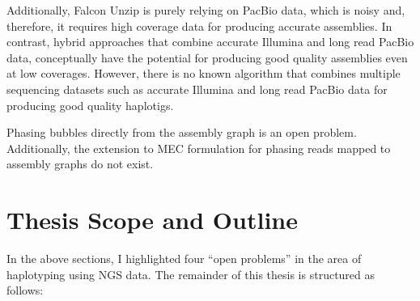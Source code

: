 Additionally, Falcon Unzip is purely relying on PacBio data, which is noisy and, therefore, it requires high coverage data for producing accurate assemblies.
In contrast, hybrid approaches that combine accurate Illumina and long read PacBio data, conceptually have the potential for producing good quality assemblies even at low coverages.
However, there is no known algorithm that combines multiple sequencing datasets such as accurate Illumina and long read PacBio data for producing good quality haplotigs.
\begin{gaps}
 Phasing bubbles directly from the assembly graph is an open problem. Additionally, the extension to MEC formulation for phasing reads mapped to assembly graphs do not exist. 
 \label{gap:gap4}
\end{gaps}


\section{Thesis Scope and Outline}
In the above sections, I highlighted four ``open problems'' in the area of haplotyping using NGS data.
The remainder of this thesis is structured as follows:

